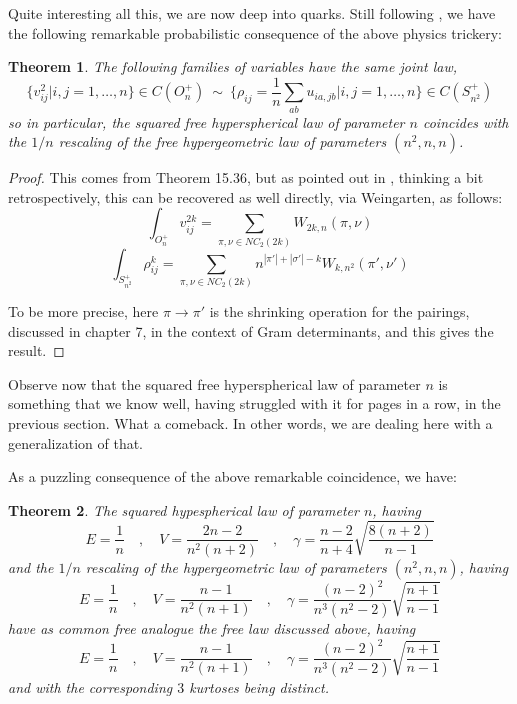 \documentclass[12pt]{amsbook}
\newtheorem{theorem}{Theorem}[chapter]
\begin{document}
Quite interesting all this, we are now deep into quarks. Still following \cite{bbc}, we have the following remarkable probabilistic consequence of the above physics trickery:

\begin{theorem}
The following families of variables have the same joint law,
$$\Big\{v_{ij}^2\Big|i,j=1,\ldots,n\Big\}\in C(O_n^+)\ \sim\ \Big\{\rho_{ij}=\frac{1}{n}\sum_{ab}u_{ia,jb}\Big|i,j=1,\ldots,n\Big\}\in C(S_{n^2}^+)$$
so in particular, the squared free hyperspherical law of parameter $n$ coincides with the $1/n$ rescaling of the free hypergeometric law of parameters $(n^2,n,n)$.
\end{theorem}

\begin{proof}
This comes from Theorem 15.36, but as pointed out in \cite{bbc}, thinking a bit retrospectively, this can be recovered as well directly, via Weingarten, as follows:
$$\int_{O_n^+}v_{ij}^{2k}=\sum_{\pi,\nu\in NC_2(2k)}W_{2k,n}(\pi,\nu)$$
$$\int_{S_{n^2}^+}\rho_{ij}^k=\sum_{\pi,\nu\in NC_2(2k)}n^{|\pi'|+|\sigma'|-k}W_{k,n^2}(\pi',\nu')$$

To be more precise, here $\pi\to\pi'$ is the shrinking operation for the pairings, discussed in chapter 7, in the context of Gram determinants, and this gives the result.
\end{proof}

Observe now that the squared free hyperspherical law of parameter $n$ is something that we know well, having struggled with it for pages in a row, in the previous section. What a comeback. In other words, we are dealing here with a generalization of that.

\bigskip

As a puzzling consequence of the above remarkable coincidence, we have:

\begin{theorem}
The squared hypespherical law of parameter $n$, having
$$E=\frac{1}{n}\quad,\quad V=\frac{2n-2}{n^2(n+2)}\quad,\quad\gamma=\frac{n-2}{n+4}\sqrt{\frac{8(n+2)}{n-1}}$$
and the $1/n$ rescaling of the hypergeometric law of parameters $(n^2,n,n)$, having
$$E=\frac{1}{n}\quad,\quad V=\frac{n-1}{n^2(n+1)}\quad,\quad\gamma=\frac{(n-2)^2}{n^3(n^2-2)}\sqrt{\frac{n+1}{n-1}}$$
have as common free analogue the free law discussed above, having
$$E=\frac{1}{n}\quad,\quad V=\frac{n-1}{n^2(n+1)}\quad,\quad\gamma=\frac{(n-2)^2}{n^3(n^2-2)}\sqrt{\frac{n+1}{n-1}}$$
and with the corresponding $3$ kurtoses being distinct.
\end{theorem}
\end{document}
